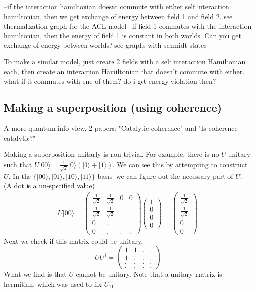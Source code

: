 \documentclass{article}
\begin{document}
--if the interaction hamiltonian doesnt commute with either self interaction hamiltonian, then we get exchange of energy between field 1 and field 2. see thermalization graph for the ACL model
--if field 1 commutes with the interaction hamiltonian, then the energy of field 1 is constant in both worlds. Can you get exchange of energy between worlds? see graphs with schmidt states

To make a similar model, just create 2 fields with a self interaction Hamiltonian each, then create an interaction Hamiltonian that doesn't commute with either. what if it commutes with one of them? do i get energy violation then?



\subsection{Making a superposition (using coherence)}
A more quantum info view. 2 papers: "Catalytic coherence" and "Is coherence catalytic?"

Making a superposition unitarly is non-trivial. For example, there is no $U$ unitary such that $U|00\rangle=\frac{1}{\sqrt{2}}|0\rangle(|0\rangle+|1\rangle)$. We can see this by attempting to construct $U$. In the $\{|00\rangle,|01\rangle,|10\rangle,|11\rangle\}$ basis, we can figure out the necessary part of $U$. (A dot is a un-specified value)
\begin{align}
    U|00\rangle=
    \begin{pmatrix}
        \frac{1}{\sqrt{2}} & \frac{1}{\sqrt{2}} & 0 & 0\\
        \frac{1}{\sqrt{2}} & \frac{1}{\sqrt{2}} & . & .\\
        0 & . & . & .\\
        0 & . & . & .
    \end{pmatrix}
    \begin{pmatrix}
        1\\
        0\\
        0\\
        0
    \end{pmatrix}
    =
    \begin{pmatrix}
        \frac{1}{\sqrt{2}}\\
        \frac{1}{\sqrt{2}}\\
        0\\
        0
    \end{pmatrix}
\end{align}
Next we check if this matrix could be unitary,
\begin{equation}
    UU^{\dagger}=
    \begin{pmatrix}
        1 & 1 & . & .\\
        1 & . & . & .\\
        . & . & . & .\\
        . & . & . & .
    \end{pmatrix}
\end{equation}
What we find is that $U$ cannot be unitary.
Note that a unitary matrix is hermitian, which was used to fix $U_{11}$
\end{document}
